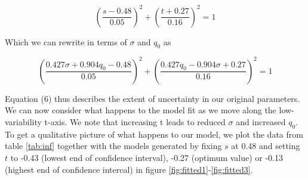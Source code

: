 \documentclass{article}
\begin{document}
\begin{equation*}
(\dfrac{s-0.48}{0.05})^2 + (\dfrac{t+0.27}{0.16})^2 = 1
\end{equation*}

Which we can rewrite in terms of $\sigma$ and $q_0$ as

\begin{equation}
(\dfrac{0.427\sigma+0.904q_0-0.48}{0.05})^2 + (\dfrac{0.427q_0 - 0.904 \sigma +0.27}{0.16})^2 = 1
\end{equation}

Equation (6) thus describes the extent of uncertainty in our original parameters. We can now consider what happens to the model fit as we move along the low-variability t-axis. We note that increasing t leads to reduced $\sigma$ and increased $q_0$. To get a qualitative picture of what happens to our model, we plot the data from table \ref{tab:inf} together with the models generated by fixing $s$ at 0.48 and setting $t$ to -0.43 (lowest end of confidence interval), -0.27 (optimum value) or -0.13 (highest end of confidence intercal) in figure \ref{fig:fitted1}-\ref{fig:fitted3}.
\end{document}
